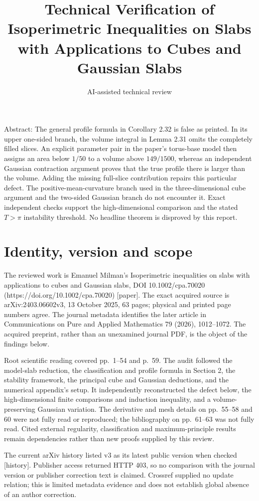 \documentclass[10pt]{article}
\title{Technical Verification of Isoperimetric Inequalities on Slabs with Applications to Cubes and Gaussian Slabs}
\author{AI-assisted technical review}
\date{}
\begin{document}
\maketitle
Abstract: The general profile formula in Corollary 2.32 is false as printed. In its upper one-sided branch, the volume integral in Lemma 2.31 omits the completely filled slices. An explicit parameter pair in the paper’s torus-base model then assigns an area below \(1/50\) to a volume above \(149/1500\), whereas an independent Gaussian contraction argument proves that the true profile there is larger than the volume. Adding the missing full-slice contribution repairs this particular defect. The positive-mean-curvature branch used in the three-dimensional cube argument and the two-sided Gaussian branch do not encounter it. Exact independent checks support the high-dimensional comparison and the stated \(T>\pi\) instability threshold. No headline theorem is disproved by this report.\par
\section*{Identity, version and scope}
The reviewed work is Emanuel Milman’s Isoperimetric inequalities on slabs with applications to cubes and Gaussian slabs, DOI 10.1002/cpa.70020 (https://doi.org/10.1002/cpa.70020) [paper]. The exact acquired source is arXiv:2403.06602v3, 13 October 2025, 63 pages; physical and printed page numbers agree. The journal metadata identifies the later article in Communications on Pure and Applied Mathematics 79 (2026), 1012–1072. The acquired preprint, rather than an unexamined journal PDF, is the object of the findings below.\par
Root scientific reading covered pp. 1–54 and p. 59. The audit followed the model-slab reduction, the classification and profile formula in Section 2, the stability framework, the principal cube and Gaussian deductions, and the numerical appendix’s setup. It independently reconstructed the defect below, the high-dimensional finite comparisons and induction inequality, and a volume-preserving Gaussian variation. The derivative and mesh details on pp. 55–58 and 60 were not fully read or reproduced; the bibliography on pp. 61–63 was not fully read. Cited external regularity, classification and maximum-principle results remain dependencies rather than new proofs supplied by this review.\par
The current arXiv history listed v3 as its latest public version when checked [history]. Publisher access returned HTTP 403, so no comparison with the journal version or publisher correction text is claimed. Crossref supplied no update relation; this is limited metadata evidence and does not establish global absence of an author correction.\par
\end{document}
